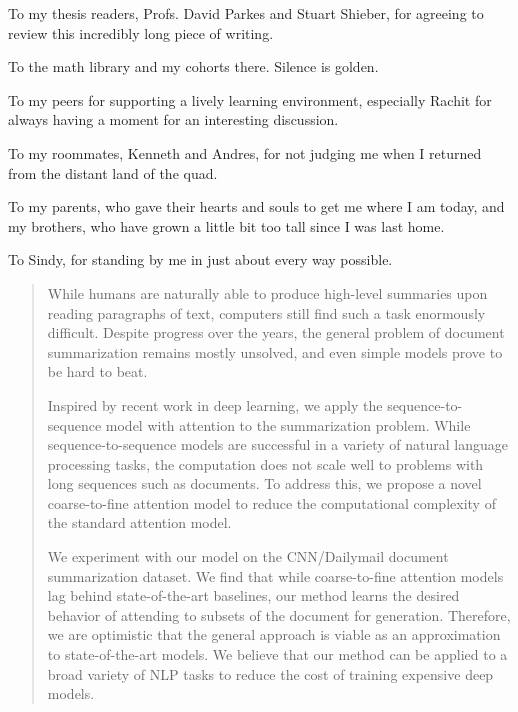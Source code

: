 \documentclass[12pt]{report}
\begin{document}
To my thesis readers, Profs. David Parkes and Stuart Shieber, for agreeing to review this incredibly long piece of writing.

To the math library and my cohorts there. Silence is golden.

To my peers for supporting a lively learning environment, especially Rachit for always having a moment for an interesting discussion.

To my roommates, Kenneth and Andres, for not judging me when I returned from the distant land of the quad.

To my parents, who gave their hearts and souls to get me where I am today, and my brothers, who have grown a little bit too tall since I was last home.

To Sindy, for standing by me in just about every way possible.


\clearpage %


\begin{abstract} %
While humans are naturally able to produce high-level summaries upon reading paragraphs of text, computers still find such a task enormously difficult. Despite progress over the years, the general problem of document summarization remains mostly unsolved, and even simple models prove to be hard to beat.

Inspired by recent work in deep learning, we apply the sequence-to-sequence model with attention to the summarization problem. While sequence-to-sequence models are successful in a variety of natural language processing tasks, the computation does not scale well to problems with long sequences such as documents. To address this, we propose a novel coarse-to-fine attention model to reduce the computational complexity of the standard attention model.

We experiment with our model on the CNN/Dailymail document summarization dataset. We find that while coarse-to-fine attention models lag behind state-of-the-art baselines, our method learns the desired behavior of attending to subsets of the document for generation.
Therefore, we are optimistic that the general approach is viable as an approximation to state-of-the-art models. We believe that our method can be applied to a broad variety of NLP tasks to reduce the cost of training expensive deep models.
\end{abstract}
\end{document}
